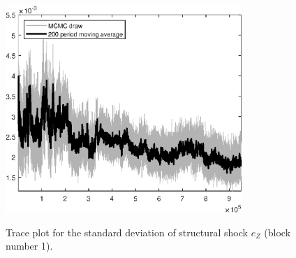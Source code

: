 \begin{figure}[H]
\centering
  \includegraphics[width=0.8\textwidth]{BRS_growth_util_sectoral/graphs/TracePlot_SE_e_Z_blck_1}\\
    \caption{Trace plot for the standard deviation of structural shock ${e_Z}$ (block number 1).}
\end{figure}
